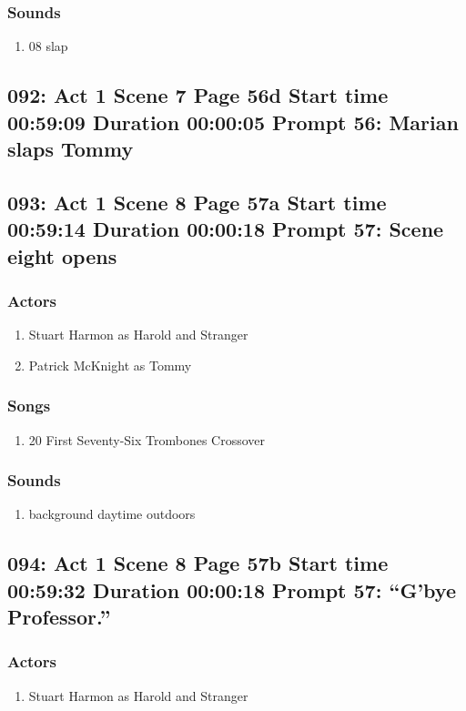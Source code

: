 \subsubsection{Sounds}
\begin{enumerate}
\item 08 slap
\end{enumerate}
\subsection{092: Act 1 Scene 7 Page 56d Start time 00:59:09 Duration 00:00:05 Prompt 56: Marian slaps Tommy}

\subsection{093: Act 1 Scene 8 Page 57a Start time 00:59:14 Duration 00:00:18 Prompt 57: Scene eight opens}

\subsubsection{Actors}
\begin{enumerate}
\item Stuart Harmon as Harold and Stranger
\item Patrick McKnight as Tommy
\end{enumerate}

\subsubsection{Songs}
\begin{enumerate}
\item 20 First Seventy-Six Trombones Crossover
\end{enumerate}\subsubsection{Sounds}
\begin{enumerate}
\item background daytime outdoors
\end{enumerate}
\subsection{094: Act 1 Scene 8 Page 57b Start time 00:59:32 Duration 00:00:18 Prompt 57: ``G'bye Professor.''}

\subsubsection{Actors}
\begin{enumerate}
\item Stuart Harmon as Harold and Stranger
\end{enumerate}

